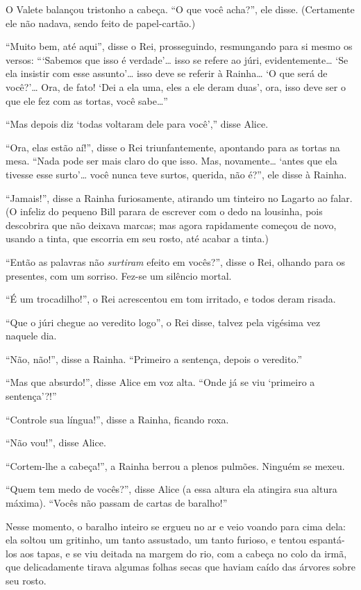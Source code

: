 O Valete balançou tristonho a cabeça. ``O que você acha?'', ele disse.
(Certamente ele não nadava, sendo feito de papel-cartão.)

``Muito bem, até aqui'', disse o Rei, prosseguindo, resmungando para si
mesmo os versos: ```Sabemos que isso é verdade'\ldots{} isso se refere ao
júri, evidentemente\ldots{} `Se ela insistir com esse assunto'\ldots{} isso deve
se referir à Rainha\ldots{} `O que será de você?'\ldots{} Ora, de fato! `Dei a ela
uma, eles a ele deram duas', ora, isso deve ser o que ele fez com as
tortas, você sabe\ldots{}''

``Mas depois diz `todas voltaram dele para você','' disse Alice.

``Ora, elas estão aí!'', disse o Rei triunfantemente, apontando para as
tortas na mesa. ``Nada pode ser mais claro do que isso. Mas,
novamente\ldots{} `antes que ela tivesse esse surto'\ldots{} você nunca teve
surtos, querida, não é?'', ele disse à Rainha.

``Jamais!'', disse a Rainha furiosamente, atirando um tinteiro no
Lagarto ao falar. (O infeliz do pequeno Bill parara de escrever com o
dedo na lousinha, pois descobrira que não deixava marcas; mas agora
rapidamente começou de novo, usando a tinta, que escorria em seu rosto,
até acabar a tinta.)

``Então as palavras não \emph{surtiram} efeito em vocês?'', disse o Rei,
olhando para os presentes, com um sorriso. Fez-se um silêncio mortal.

``É um trocadilho!'', o Rei acrescentou em tom irritado, e todos deram
risada.

``Que o júri chegue ao veredito logo'', o Rei disse, talvez pela
vigésima vez naquele dia.

``Não, não!'', disse a Rainha. ``Primeiro a sentença, depois o
veredito.''

``Mas que absurdo!'', disse Alice em voz alta. ``Onde já se viu
`primeiro a sentença'?!''

``Controle sua língua!'', disse a Rainha, ficando roxa.

``Não vou!'', disse Alice.

``Cortem-lhe a cabeça!'', a Rainha berrou a plenos pulmões. Ninguém se
mexeu.

``Quem tem medo de vocês?'', disse Alice (a essa altura ela atingira sua
altura máxima). ``Vocês não passam de cartas de baralho!''

Nesse momento, o baralho inteiro se ergueu no ar e veio voando para
cima dela: ela soltou um gritinho, um tanto assustado, um tanto furioso,
e tentou espantá-los aos tapas, e se viu deitada na margem do rio, com a
cabeça no colo da irmã, que delicadamente tirava algumas folhas secas
que haviam caído das árvores sobre seu rosto.

